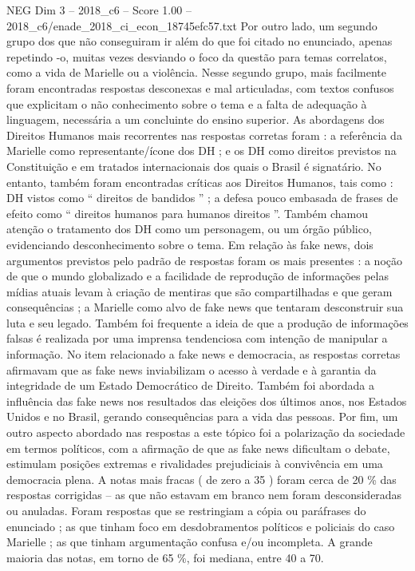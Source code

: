 \begin{textsample}{NEG Dim 3 – 2018\_c6 – Score 1.00 – 2018\_c6/enade\_2018\_ci\_econ\_18745efc57.txt}
Por outro lado, um segundo grupo dos que não conseguiram ir além do que foi citado no enunciado, apenas repetindo -o, muitas vezes desviando o foco da questão para temas correlatos, como a vida de Marielle ou a violência.
Nesse segundo grupo, mais facilmente foram encontradas respostas desconexas e mal articuladas, com textos confusos que explicitam o não conhecimento sobre o tema e a falta de adequação à linguagem, necessária a um concluinte do ensino superior.
As abordagens dos Direitos Humanos mais recorrentes nas respostas corretas foram : a referência da Marielle como representante/ícone dos DH ; e os DH como direitos previstos na Constituição e em tratados internacionais dos quais o Brasil é signatário.
No entanto, também foram encontradas críticas aos Direitos Humanos, tais como : DH vistos como “ direitos de bandidos ” ; a defesa pouco embasada de frases de efeito como “ direitos humanos para humanos direitos ”.
Também chamou atenção o tratamento dos DH como um personagem, ou um órgão público, evidenciando desconhecimento sobre o tema.
Em relação às fake news, dois argumentos previstos pelo padrão de respostas foram os mais presentes : a noção de que o mundo globalizado e a facilidade de reprodução de informações pelas mídias atuais levam à criação de mentiras que são compartilhadas e que geram consequências ; a Marielle como alvo de fake news que tentaram desconstruir sua luta e seu legado.
Também foi frequente a ideia de que a produção de informações falsas é realizada por uma imprensa tendenciosa com intenção de manipular a informação.
No item relacionado a fake news e democracia, as respostas corretas afirmavam que as fake news inviabilizam o acesso à verdade e à garantia da integridade de um Estado Democrático de Direito.
Também foi abordada a influência das fake news nos resultados das eleições dos últimos anos, nos Estados Unidos e no Brasil, gerando consequências para a vida das pessoas.
Por fim, um outro aspecto abordado nas respostas a este tópico foi a polarização da sociedade em termos políticos, com a afirmação de que as fake news dificultam o debate, estimulam posições extremas e rivalidades prejudiciais à convivência em uma democracia plena.
A notas mais fracas ( de zero a 35 ) foram cerca de 20 \% das respostas corrigidas – as que não estavam em branco nem foram desconsideradas ou anuladas.
Foram respostas que se restringiam a cópia ou paráfrases do enunciado ; as que tinham foco em desdobramentos políticos e policiais do caso Marielle ; as que tinham argumentação confusa e/ou incompleta.
A grande maioria das notas, em torno de 65 \%, foi mediana, entre 40 a 70.

\end{textsample}
